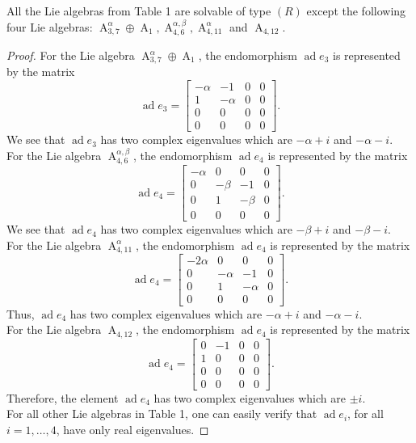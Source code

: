 \documentclass[10pt,a4paper]{amsart}
\begin{document}
\begin{proposition}
All the Lie algebras from Table 1 are solvable of type $(R)$ except the following four Lie algebras: $\operatorname{A}_{3, 7}^{\alpha} \oplus \operatorname{A}_1, \operatorname{A}_{4, 6}^{\alpha, \beta}, \operatorname{A}_{4, 11}^{\alpha}$ and $\operatorname{A}_{4, 12}$.
\end{proposition}

\begin{proof}
For the Lie algebra $\operatorname{A}_{3, 7}^{\alpha} \oplus \operatorname{A}_1$, the endomorphism $\operatorname{ad} e_3$ is represented by the matrix
$$\operatorname{ad} e_3 = \begin{bmatrix}
-\alpha & -1 & 0 & 0\\
1 & -\alpha & 0 & 0\\
0 & 0 & 0 & 0\\
0 & 0 & 0 & 0
\end{bmatrix}.$$
We see that $\operatorname{ad} e_3$ has two complex eigenvalues which are $-\alpha + i$ and $-\alpha - i$.\\
For the Lie algebra $\operatorname{A}_{4, 6}^{\alpha, \beta}$, the endomorphism $\operatorname{ad} e_4$ is represented by the matrix
$$\operatorname{ad} e_4 = \begin{bmatrix}
-\alpha & 0 & 0 & 0\\
0 & -\beta & -1 & 0\\
0 & 1 & -\beta & 0\\
0 & 0 & 0 & 0
\end{bmatrix}.$$
We see that $\operatorname{ad} e_4$ has two complex eigenvalues which are $-\beta + i$ and $-\beta - i$.\\
For the Lie algebra $\operatorname{A}_{4, 11}^{\alpha}$, the endomorphism $\operatorname{ad} e_4$ is represented by the matrix
$$\operatorname{ad} e_4 = \begin{bmatrix}
-2\alpha & 0 & 0 & 0\\
0 & -\alpha & -1 & 0\\
0 & 1 & -\alpha & 0\\
0 & 0 & 0 & 0
\end{bmatrix}.$$
Thus, $\operatorname{ad} e_4$ has two complex eigenvalues which are $-\alpha + i$ and $-\alpha - i$.\\
For the Lie algebra $\operatorname{A}_{4, 12}$, the endomorphism $\operatorname{ad} e_4$ is represented by the matrix
$$\operatorname{ad} e_4 = \begin{bmatrix}
0 & -1 & 0 & 0\\
1 & 0 & 0 & 0\\
0 & 0 & 0 & 0\\
0 & 0 & 0 & 0
\end{bmatrix}.$$
Therefore, the element $\operatorname{ad} e_4$ has two complex eigenvalues which are $\pm i$.\\
For all other Lie algebras in Table 1, one can easily verify that $\operatorname{ad} e_i$, for all $i = 1, \dots, 4$, have only real eigenvalues.
\end{proof}
\end{document}
